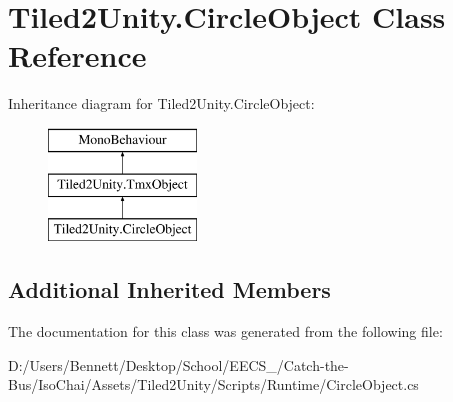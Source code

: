 \hypertarget{class_tiled2_unity_1_1_circle_object}{}\section{Tiled2\+Unity.\+Circle\+Object Class Reference}
\label{class_tiled2_unity_1_1_circle_object}
Inheritance diagram for Tiled2\+Unity.\+Circle\+Object\+:\begin{figure}[H]
\begin{center}
\leavevmode
\includegraphics[height=3.000000cm]{class_tiled2_unity_1_1_circle_object}
\end{center}
\end{figure}
\subsection*{Additional Inherited Members}


The documentation for this class was generated from the following file\+:\begin{DoxyCompactItemize}
\item 
D\+:/\+Users/\+Bennett/\+Desktop/\+School/\+E\+E\+C\+S\+\_/\+Catch-\/the-\/\+Bus/\+Iso\+Chai/\+Assets/\+Tiled2\+Unity/\+Scripts/\+Runtime/Circle\+Object.\+cs\end{DoxyCompactItemize}
